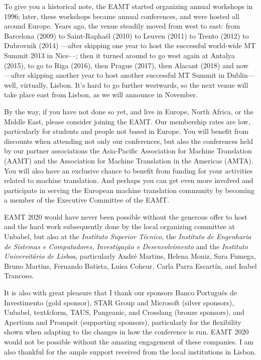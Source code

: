 \documentclass[a4paper,11pt,twoside]{book}
\begin{document}
\begin{onehalfspacing}
To give you a historical note, the EAMT started organizing annual workshops in 1996; later, these workshops became annual conferences, and were hosted all around Europe. Years ago, the venue steadily moved from west to east: from Barcelona (2009) to Saint-Rapha\"{e}l (2010) to Leuven (2011) to Trento (2012) to Dubrovnik (2014) ---after skipping one year to host the successful world-wide MT Summit 2013 in Nice---; then it turned  around to go west again at Antalya (2015),
to go to Riga (2016), then Prague (2017), then Alacant (2018) and now ---after skipping another year to host another successful MT Summit in Dublin--- well, virtually, Lisbon. It's hard to go further westwards, so the next venue will take place east from Lisbon, as we will announce in November.

By the way, if you have not done so yet, and live in Europe, North Africa, or the Middle East,
please consider joining the EAMT. Our membership rates are low, particularly for students
and people not based in Europe. You will benefit from discounts when attending not only
our conferences, but also the conferences held by our partner associations the Asia-Pacific
Association for Machine Translation (AAMT) and the Association for Machine Translation in
the Americas (AMTA). You will also have an exclusive chance to benefit from funding for your
activities related to machine translation. And perhaps you can get even more involved and
participate in serving the European machine translation community by becoming a member of
the Executive Committee of the EAMT.


EAMT 2020 would have never been possible without the generous offer to host and the
hard work subsequently done by the local organizing committee at Unbabel, but also at the \emph{Instituto Superior Técnico}, the \emph{Instituto de Engenharia de Sistemas e Computadores, Investigação e Desenvolvimento} and the \emph{Instituto Universitário de Lisboa}, particularly André Martins, Helena Moniz, Sara Fumega, Bruno Martins, Fernando Batista, Luisa Coheur, Carla Parra Escartín, and Isabel Trancoso.

It is also with great pleasure that I thank our sponsors Banco Português de Investimento (gold sponsor), STAR Group and Microsoft (silver sponsors), Unbabel, text\&form, TAUS, Pangeanic, and Crosslang (bronze sponsors), and Apertium and Prompsit (supporting sponsors), particularly for the flexibility shown when adapting to the changes in how the conference is run. EAMT 2020 would not be possible without the amazing engagement of these companies. I am also thankful for the ample support received from the local institutions in Lisbon. 


\end{onehalfspacing}
\end{document}
